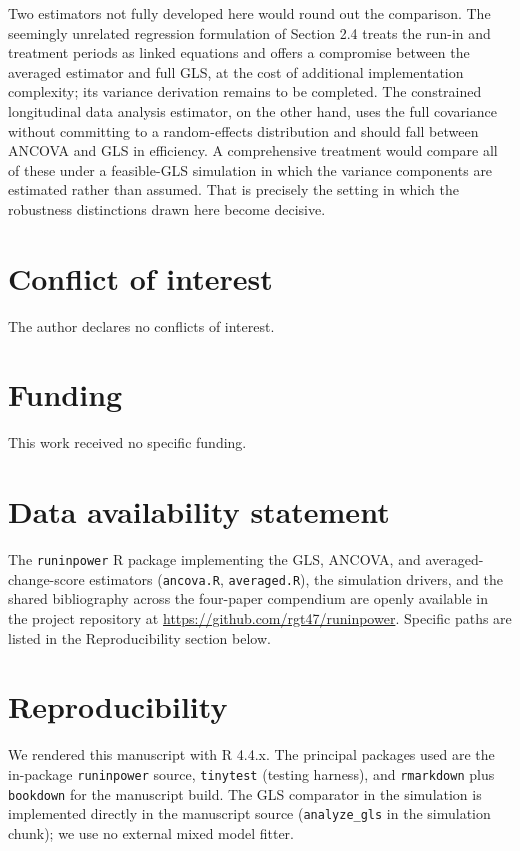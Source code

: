 \documentclass[
  11pt,
]{article}
\begin{document}
Two estimators not fully developed here would round out
the comparison. The seemingly unrelated regression
formulation of Section 2.4 treats the run-in and
treatment periods as linked equations and offers a
compromise between the averaged estimator and full GLS,
at the cost of additional implementation complexity; its
variance derivation remains to be completed. The
constrained longitudinal data analysis estimator, on the
other hand, uses the full covariance without committing
to a random-effects distribution and should fall between
ANCOVA and GLS in efficiency. A comprehensive treatment
would compare all of these under a feasible-GLS
simulation in which the variance components are
estimated rather than assumed. That is precisely the
setting in which the robustness distinctions drawn here
become decisive.

\section{Conflict of interest}\label{conflict-of-interest}

The author declares no conflicts of interest.

\section{Funding}\label{funding}

This work received no specific funding.

\section{Data availability statement}\label{data-availability-statement}

The \texttt{runinpower} R package implementing the GLS, ANCOVA,
and averaged-change-score estimators (\texttt{ancova.R},
\texttt{averaged.R}), the simulation drivers, and the shared
bibliography across the four-paper compendium are
openly available in the project repository at
\url{https://github.com/rgt47/runinpower}.
Specific paths are listed in the Reproducibility section
below.

\section{Reproducibility}\label{reproducibility}

We rendered this manuscript with R 4.4.x. The principal
packages used are the in-package \texttt{runinpower} source,
\texttt{tinytest} (testing harness), and \texttt{rmarkdown} plus
\texttt{bookdown} for the manuscript build. The GLS comparator
in the simulation is implemented directly in the
manuscript source (\texttt{analyze\_gls} in the simulation
chunk); we use no external mixed model fitter.
\end{document}
